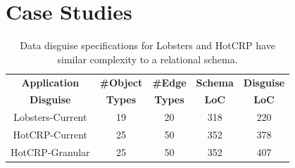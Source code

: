 \section{Case Studies}
\label{sec:hotcrp_example}

\begin{table}[t!]
    \centering
    \footnotesize
    \begin{tabular}{@{}ccccc@{}}
        \textbf{Application} & \textbf{\#Object} & \textbf{\#Edge} & \textbf{Schema} &
        \textbf{Disguise} \\
        \textbf{Disguise} & \textbf{Types} & \textbf{Types} & \textbf{LoC} & \textbf{LoC} \\
    \midrule
    Lobsters-Current & 19 & 20 & 318 & 220 \\
    HotCRP-Current & 25 & 50 & 352 & 378 \\
    HotCRP-Granular & 25 & 50 & 352 & 407 \\
\end{tabular}
    \caption{Data disguise specifications for Lobsters and HotCRP have similar complexity to
    a relational schema.
    }
\label{tab:loc}
\end{table}

